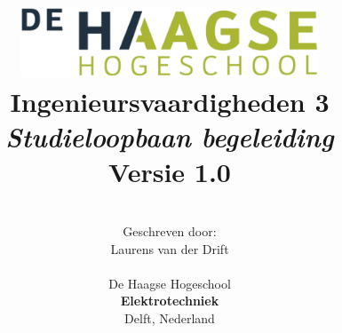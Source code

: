 \title{
\includegraphics[width=3.5in]{Media/Figuren/HHS.png} \\
\vspace*{2in}
\textbf{Ingenieursvaardigheden 3}\\
\textit{Studieloopbaan begeleiding}\\
Versie 1.0
}
\author{
\vspace*{1.5in} \\
  Geschreven door:\\
  Laurens van der Drift\\
		\vspace*{1in} \\
		De Haagse Hogeschool\\
        \textbf{Elektrotechniek}\\
        Delft, Nederland
       } 